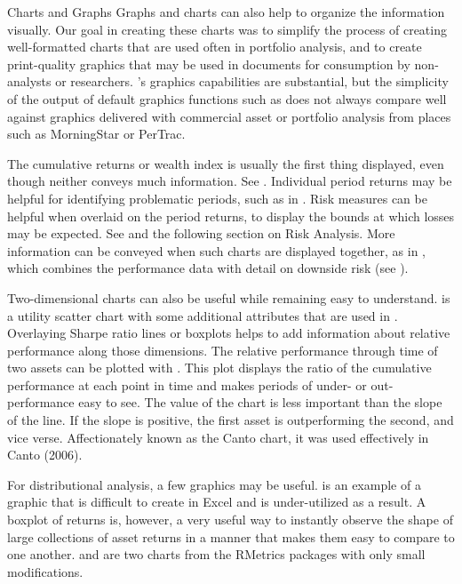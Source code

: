 \documentclass[12pt,letterpaper,english]{article}
\begin{document}
\begin{Section}{Charts and Graphs}
Graphs and charts can also help to organize the information visually. Our goal in creating these charts was to simplify the process of creating well-formatted charts that are used often in portfolio analysis, and to create print-quality graphics that may be used in documents for consumption by non-analysts or researchers. \R's graphics capabilities are substantial, but the simplicity of the output of \R{} default graphics functions such as  does not always compare well against graphics delivered with commercial asset or portfolio analysis from places such as MorningStar or PerTrac.

The cumulative returns or wealth index is usually the first thing displayed, even though neither conveys much information.  See .  Individual period returns may be helpful for identifying problematic periods, such as in .  Risk measures can be helpful when overlaid on the period returns, to display the bounds at which losses may be expected.  See  and the following section on Risk Analysis.  More information can be conveyed when such charts are displayed together, as in , which combines the performance data with detail on downside risk (see ).

Two-dimensional charts can also be useful while remaining easy to understand.   is a utility scatter chart with some additional attributes that are used in .  Overlaying Sharpe ratio lines or boxplots helps to add information about relative performance along those dimensions. The relative performance through time of two assets can be plotted with .  This plot displays the ratio of the cumulative performance at each point in time and makes periods of under- or out-performance easy to see.  The value of the chart is less important than the slope of the line.  If the slope is positive, the first asset is outperforming the second, and vice verse.  Affectionately known as the Canto chart, it was used effectively in Canto (2006).

For distributional analysis, a few graphics may be useful.   is an example of a graphic that is difficult to create in Excel and is under-utilized as a result.  A boxplot of returns is, however, a very useful way to instantly observe the shape of large collections of asset returns in a manner that makes them easy to compare to one another.   and  are two charts from the RMetrics packages with only small modifications.


\end{Section}
\end{document}
